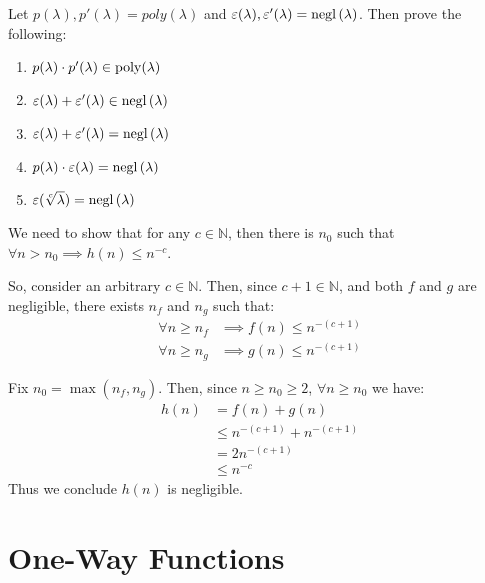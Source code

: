 \begin{exercise}
    Let $p(\lambda), p'(\lambda) = poly(\lambda)$ and $\varepsilon(\lambda), \varepsilon'(\lambda) = \mathrm{negl}\left({\lambda}\right)$.
    Then prove the following:
    \begin{enumerate}
        \item $p(\lambda) \cdot p'( \lambda) \in  \mathrm{poly}(\lambda)$
        \item $\varepsilon(\lambda) + \varepsilon'(\lambda) \in \mathrm{negl}\left({\lambda}\right)$
        \item $\varepsilon(\lambda) + \varepsilon'(\lambda) = \mathrm{negl}\left({\lambda}\right)$
        \item $p(\lambda) \cdot \varepsilon(\lambda) = \mathrm{negl}\left({\lambda}\right)$
        \item $\varepsilon(\sqrt[c]{\lambda}) = \mathrm{negl}\left({\lambda}\right)$
    \end{enumerate} 
\end{exercise}

\begin{solution}

    We need to show that for any $c \in \mathbb{N} $, then there is $n_{0}$ such that $\forall n > n_{0} \implies h(n) \leq n^{-c}$.
    
    So, consider an arbitrary $c \in \mathbb{N}$. Then, since $c+1 \in \mathbb{N} $, and both $f$ and $g$ are negligible, there exists $n_{f}$ and $n_{g}$ such that:
    \begin{align*}
        \forall n \geq n_{f} &\implies f(n) \leq n^{-(c+1)} \\
        \forall n \geq n_{g} &\implies g(n) \leq n^{-(c+1)}
    \end{align*}

    Fix $n_{0} = \max(n_{f}, n_{g})$. Then, since $n \geq n_{0} \geq 2$, $\forall n \geq n_{0}$ we have:
    \begin{align*}
        h(n) &= f(n)+g(n) \\
        &\leq n^{-(c+1)} + n^{-(c+1)} \\
        &= 2n^{-(c+1)} \\
        &\leq n^{-c}
    \end{align*}
    Thus we conclude $h(n)$ is negligible.
\end{solution}


\section{One-Way Functions}

